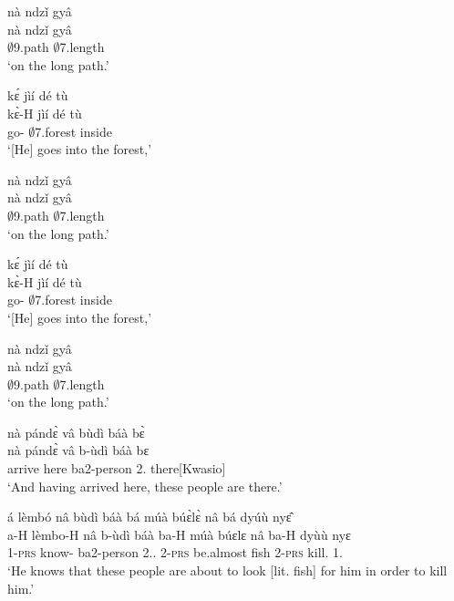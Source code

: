 \begin{exe}[(A34)]
\exA\label{a20}
  \glll   nà ndzǐ gyâ   \\
          nà ndzǐ gyâ   \\
           {\COM} $\emptyset$9.path $\emptyset$7.length \\
    \trans `on the long path.'
 
\exA\label{a21}
  \glll   kɛ́ jìí dé tù \\
         kɛ̀-H jìí dé tù  \\
         go-{\R} $\emptyset$7.forest {\LOC} inside        \\
    \trans `[He] goes into the forest,'
 
\exA\label{a22}
  \glll  nà ndzǐ gyâ    \\
      nà ndzǐ gyâ   \\
          {\COM} $\emptyset$9.path $\emptyset$7.length       \\
    \trans `on the long path.'
 
\exA\label{a23}
  \glll   kɛ́ jìí dé tù  \\
         kɛ̀-H jìí dé tù  \\
         go-{\R} $\emptyset$7.forest {\LOC} inside        \\
    \trans `[He] goes into the forest,'

\exA\label{a24}
  \glll   nà ndzǐ gyâ \\
          nà ndzǐ gyâ \\
      {\COM} $\emptyset$9.path $\emptyset$7.length   \\
    \trans `on the long path.'
 
\exA\label{a24a}
  \glll   nà pándɛ̀ vâ bùdì báà bɛ̀ \\
          nà pándɛ̀ vâ b-ùdì báà bɛ \\
      {\CONJ} arrive here ba2-person 2.{\COP} there[Kwasio]   \\
    \trans `And having arrived here, these people are there.'
 
\exA\label{a24b}
  \glll   á lèmbó nâ bùdì báà bá múà búɛ̀lɛ̀ nâ bá dyúù nyɛ̂  \\
          a-H lèmbo-H nâ b-ùdì báà ba-H múà búɛlɛ nâ ba-H dyùù nyɛ  \\
1-\textsc{prs} know-{\R} {\COMP} ba2-person 2.{\DEM}.{\PROX} 2-\textsc{prs} be.almost fish {\COMP} 2-\textsc{prs} kill.{\SBJV}  1.{\OBJ}   \\
    \trans `He knows that these people are about to look [lit. fish] for him in order to kill him.'
 

\end{exe}
